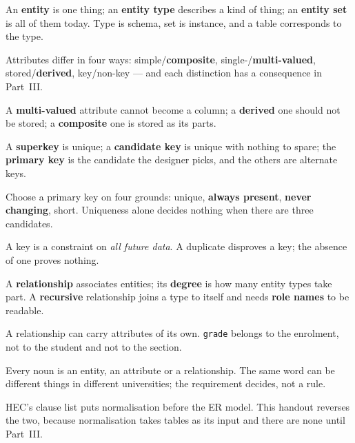 \begin{chaptersummary}
\begin{tight}
  \item An \textbf{entity} is one thing; an \textbf{entity type} describes a
        kind of thing; an \textbf{entity set} is all of them today. Type is
        schema, set is instance, and a table corresponds to the type.
  \item Attributes differ in four ways: simple/\textbf{composite},
        single-/\textbf{multi-valued}, stored/\textbf{derived}, key/non-key ---
        and each distinction has a consequence in Part~III.
  \item A \textbf{multi-valued} attribute cannot become a column; a
        \textbf{derived} one should not be stored; a \textbf{composite} one is
        stored as its parts.
  \item A \textbf{superkey} is unique; a \textbf{candidate key} is unique with
        nothing to spare; the \textbf{primary key} is the candidate the
        designer picks, and the others are alternate keys.
  \item Choose a primary key on four grounds: unique, \textbf{always present},
        \textbf{never changing}, short. Uniqueness alone decides nothing when
        there are three candidates.
  \item A key is a constraint on \emph{all future data}. A duplicate disproves
        a key; the absence of one proves nothing.
  \item A \textbf{relationship} associates entities; its \textbf{degree} is how
        many entity types take part. A \textbf{recursive} relationship joins a
        type to itself and needs \textbf{role names} to be readable.
  \item A relationship can carry attributes of its own. \texttt{grade} belongs
        to the enrolment, not to the student and not to the section.
  \item Every noun is an entity, an attribute or a relationship. The same word
        can be different things in different universities; the requirement
        decides, not a rule.
  \item HEC's clause list puts normalisation before the ER model. This handout
        reverses the two, because normalisation takes tables as its input and
        there are none until Part~III.
\end{tight}
\end{chaptersummary}


